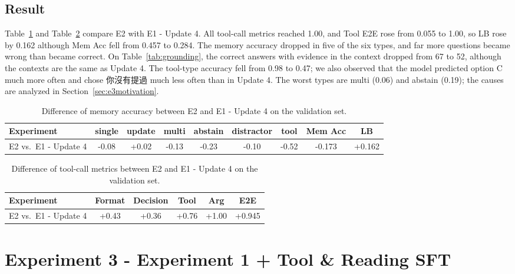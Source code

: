 \documentclass{article}
\begin{document}
\subsection{Result}
Table~\ref{tab:e2mem} and Table~\ref{tab:e2tool} compare E2 with E1 - Update 4.
All tool-call metrics reached 1.00, and Tool E2E rose from 0.055 to 1.00, so LB rose by 0.162 although Mem Acc fell from 0.457 to 0.284.
The memory accuracy dropped in five of the six types, and far more questions became wrong than became correct.
On Table~\ref{tab:grounding}, the correct answers with evidence in the context dropped from 67 to 52, although the contexts are the same as Update 4.
The tool-type accuracy fell from 0.98 to 0.47; we also observed that the model predicted option C much more often and chose 你沒有提過 much less often than in Update 4.
The worst types are multi (0.06) and abstain (0.19); the causes are analyzed in Section~\ref{sec:e3motivation}.
\begin{table}[H]
    \centering
    \small
    \begin{tabular}{lcccccccc}
        \toprule
        Experiment & single & update & multi & abstain & distractor & tool & Mem Acc & LB \\
        \midrule
        E2 vs.\ E1 - Update 4 & -0.08 & +0.02 & -0.13 & -0.23 & -0.10 & -0.52 & -0.173 & +0.162 \\
        \bottomrule
    \end{tabular}
    \caption{Difference of memory accuracy between E2 and E1 - Update 4 on the validation set.}
    \label{tab:e2mem}
\end{table}
\begin{table}[H]
    \centering
    \small
    \begin{tabular}{lccccc}
        \toprule
        Experiment & Format & Decision & Tool & Arg & E2E \\
        \midrule
        E2 vs.\ E1 - Update 4 & +0.43 & +0.36 & +0.76 & +1.00 & +0.945 \\
        \bottomrule
    \end{tabular}
    \caption{Difference of tool-call metrics between E2 and E1 - Update 4 on the validation set.}
    \label{tab:e2tool}
\end{table}

\section{Experiment 3 - Experiment 1 + Tool \& Reading SFT}
\end{document}
